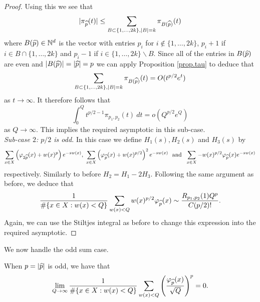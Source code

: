 \documentclass[12pt,a4paper,reqno]{amsart}
\begin{document}
\begin{proof}
Using this we see that
\[
|\pi_{\widehat{p}}(t)| \le \sum_{B \subset \{1,\ldots,2k\}, |B| = k} \pi_{B(\widehat{p})}(t) 
\]
where $B(\widehat{p}) \in {\mathbb N}^d$ is the vector with entries $p_i$ for $i \nin \{1,\ldots,2k\}$, $p_i + 1$ if $i \in B \cap \{1,\ldots,2k\}$ and $p_i-1$ if $i \in  \{1,\ldots,2k\} \backslash B$.
Since all of the entries in $B(\widehat{p})$ are even and $|B(\widehat{p})| = |\widehat{p}| = p$ we can apply Proposition \ref{prop.tau} to deduce that
\[
\sum_{B \subset \{1,\ldots,2k\}, |B| = k} \pi_{B(\widehat{p})}(t)  = O(t^{p/2}e^t)
\]
as $t\to\infty$. It therefore follows that
\[
\int_0^Q t^{p/2 -1} \pi_{p_1,p_2}(t) \ dt= o\left( Q^{p/2} e^Q\right)
\]
as $Q\to\infty$.
This implies the required asymptotic in this sub-case.\\

\noindent
\textit{Sub-case $2$: $p/2$ is odd.} In this case we define $H_1(s), H_2(s)$ and $H_3(s)$ by
\begin{align*}
\sum_{x \in X} \left(\varphi_{2\w{p}}(x)+ w(x)^p\right) e^{-sw(x)}, \ \sum_{x \in X} \left(\varphi_{\w{p}}(x) + w(x)^{p/2}\right)^2 e^{-sw(x)} \ \text{ and } \ \sum_{x \in X} -w(x)^{p/2} \varphi_{\w{p}}(x) e^{-sw(x)}
\end{align*}
respectively. Similarly to before $H_2 = H_1 - 2 H_3$. Following the same argument as before, we deduce that
\[
\frac{1}{\#\{x \in X: w(x) < Q\}}\sum_{w(x) <Q} w(x)^{p/2} \varphi_{\widehat{p}}(x)\sim \frac{R_{p_1,p_2}(1) Q^{p}}{C(p/2)!} .
\]
Again, we can use the Stiltjes integral as before to change this expression into the required asymptotic.
\end{proof}

We now handle the odd sum case.

\begin{proposition}\label{prop.odd}
When $p = |\widehat{p}|$ is odd,  we have that
\[
\lim_{Q\to\infty} \frac{1}{\#\{x \in X: w(x) <Q\}} \sum_{w(x) <Q} \left(\frac{\varphi_{\widehat{p}}(x)}{\sqrt{Q}}\right)^p = 0.
\]
\end{proposition}
\end{document}
